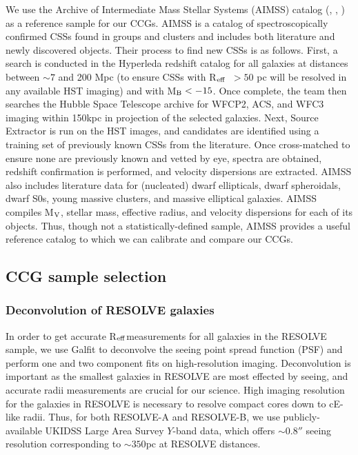 \documentclass[iop,apj,twocolappendix]{emulateapj}
\newcommand{\Reff}{R$_{\rm eff}$}
\begin{document}
\noindent We use the Archive of Intermediate Mass Stellar Systems (AIMSS) catalog (\citet{Norris2014}, \citet{Forbes2014}, \citet{Janz2015}) as a reference sample for our CCGs.  AIMSS is a catalog of spectroscopically confirmed CSSs found in groups and clusters and includes both literature and newly discovered objects. Their process to find new CSSs is as follows. First, a search is conducted in the Hyperleda redshift catalog \citep{Paturel2003} for all galaxies at distances between $\sim 7$ and 200 Mpc (to ensure CSSs with \Reff\ $> 50$ pc will be resolved in any available HST imaging) and with M$_{\rm B} < -15$. Once complete, the team then searches the Hubble Space Telescope archive for WFCP2, ACS, and WFC3 imaging within 150kpc in projection of the selected galaxies. Next, Source Extractor is run on the HST images, and candidates are identified using a training set of previously known CSSs from the literature. Once cross-matched to ensure none are previously known and vetted by eye, spectra are obtained, redshift confirmation is performed, and velocity dispersions are extracted. AIMSS also includes literature data for (nucleated) dwarf ellipticals, dwarf spheroidals, dwarf S0s, young massive clusters, and massive elliptical galaxies. AIMSS compiles M$_{\rm V}$, stellar mass, effective radius, and velocity dispersions for each of its objects. Thus, though not a statistically-defined sample, AIMSS provides a useful reference catalog to which we can calibrate and compare our CCGs.

\subsection{CCG sample selection}

\subsubsection{Deconvolution of RESOLVE galaxies}
\label{deconv}

\noindent In order to get accurate \Reff measurements for all galaxies in the RESOLVE sample, we use Galfit \citep{Peng2002} to deconvolve the seeing point spread function (PSF) and perform one and two component fits on high-resolution imaging. Deconvolution is important as the smallest galaxies in RESOLVE are most effected by seeing, and accurate radii measurements are crucial for our science. High imaging resolution for the galaxies in RESOLVE is necessary to resolve compact cores down to cE-like radii. Thus, for both RESOLVE-A and RESOLVE-B, we use publicly-available UKIDSS Large Area Survey \citep{Lawrence2007} $Y$-band data, which offers $\sim0.8''$ seeing resolution corresponding to $\sim350$pc at RESOLVE distances.
\end{document}
